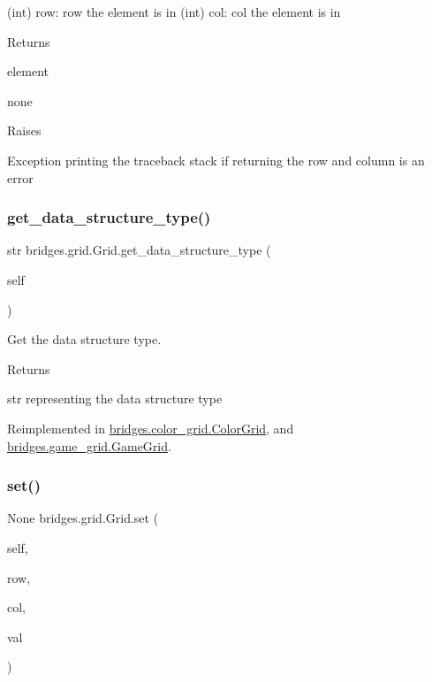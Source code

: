 \begin{DoxyVerb}       (int) row: row the element is in
       (int) col: col the element is in
\end{DoxyVerb}
 \begin{DoxyReturn}{Returns}


element 

none 

Raises 

Exception printing the traceback stack if returning the row and column is an error 
\end{DoxyReturn}
\mbox{\label{classbridges_1_1grid_1_1_grid_af7a6658d4512112c2888afc6cd946461}} 
\subsubsection{\texorpdfstring{get\_data\_structure\_type()}{get\_data\_structure\_type()}}
{\footnotesize\ttfamily  str bridges.\+grid.\+Grid.\+get\+\_\+data\+\_\+structure\+\_\+type (\begin{DoxyParamCaption}\item[{}]{self }\end{DoxyParamCaption})}



Get the data structure type. 

\begin{DoxyReturn}{Returns}


str representing the data structure type 
\end{DoxyReturn}


Reimplemented in \mbox{\hyperlink{classbridges_1_1color__grid_1_1_color_grid_a5340b1aed60318e37cab93eed6093070}{bridges.\+color\+\_\+grid.\+Color\+Grid}}, and \mbox{\hyperlink{classbridges_1_1game__grid_1_1_game_grid_a0a38f422a54e93cfd2816e0051fb8d5a}{bridges.\+game\+\_\+grid.\+Game\+Grid}}.

\mbox{\label{classbridges_1_1grid_1_1_grid_a85a0300e3326d687e06b50094eb5b5f3}} 
\subsubsection{\texorpdfstring{set()}{set()}}
{\footnotesize\ttfamily  None bridges.\+grid.\+Grid.\+set (\begin{DoxyParamCaption}\item[{}]{self,  }\item[{int}]{row,  }\item[{int}]{col,  }\item[{}]{val }\end{DoxyParamCaption})}



